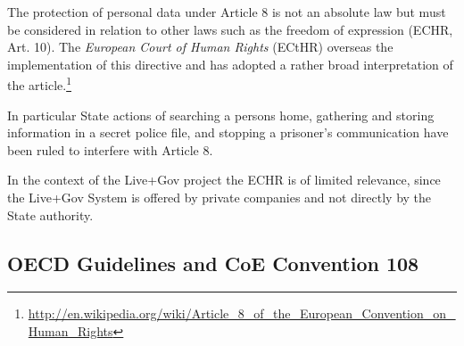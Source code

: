 The protection of personal data under Article 8 is not an absolute law but must be considered in relation to other laws such as the freedom of expression (ECHR, Art. 10).
The \emph{European Court of Human Rights} (ECtHR) overseas the implementation of this directive and has adopted a rather broad interpretation of the article.\footnote{\url{http://en.wikipedia.org/wiki/Article_8_of_the_European_Convention_on_Human_Rights}}

In particular State actions of searching a persons home, gathering and storing information in a secret police file, and stopping a prisoner's communication have been ruled to interfere with Article 8.

In the context of the Live+Gov project the ECHR is of limited relevance, since the Live+Gov System is offered by private companies and not directly by the State authority.

\subsection{OECD Guidelines and CoE Convention 108}

